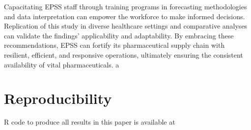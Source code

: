 \documentclass[
  authoryear,
  preprint,
  3p]{elsarticle}
\begin{document}
Capacitating EPSS staff through training programs in forecasting
methodologies and data interpretation can empower the workforce to make
informed decisions. Replication of this study in diverse healthcare
settings and comparative analyses can validate the findings'
applicability and adaptability. By embracing these recommendations, EPSS
can fortify its pharmaceutical supply chain with resilient, efficient,
and responsive operations, ultimately ensuring the consistent
availability of vital pharmaceuticals. a

\hypertarget{reproducibility}{%
\section*{Reproducibility}\label{reproducibility}}

R code to produce all results in this paper is available at


\renewcommand\refname{References}
  
\end{document}
